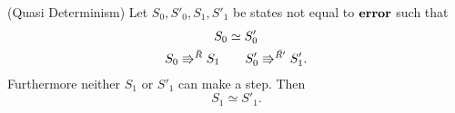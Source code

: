 \begin{theorem}{(Quasi Determinism)}
  Let $S_0, S'_0, S_1, S'_1$ be states not equal to $\mbox{{\bf error}}$ such that
  \begin{equation*}
    \begin{gathered}
      S_0 \simeq S'_0 \\
      S_0 \Rrightarrow^{\bar{R}} S_1 \quad\quad S'_0 \Rrightarrow^{\bar{R'}} S'_1.
    \end{gathered}
  \end{equation*}
  Furthermore neither $S_1$ or $S'_1$ can make a step.
  Then
  \begin{equation*}
    S_1 \simeq S'_1.
  \end{equation*}
\end{theorem}

